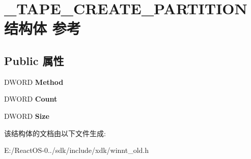 \hypertarget{struct___t_a_p_e___c_r_e_a_t_e___p_a_r_t_i_t_i_o_n}{}\section{\+\_\+\+T\+A\+P\+E\+\_\+\+C\+R\+E\+A\+T\+E\+\_\+\+P\+A\+R\+T\+I\+T\+I\+O\+N结构体 参考}
\label{struct___t_a_p_e___c_r_e_a_t_e___p_a_r_t_i_t_i_o_n}
\subsection*{Public 属性}
\begin{DoxyCompactItemize}
\item 
\mbox{\label{struct___t_a_p_e___c_r_e_a_t_e___p_a_r_t_i_t_i_o_n_a263e15a8475a1097511cfd89737d36f8}} 
D\+W\+O\+RD {\bfseries Method}
\item 
\mbox{\label{struct___t_a_p_e___c_r_e_a_t_e___p_a_r_t_i_t_i_o_n_a4341ab79e76da5fc5f2b8e06b1afebb3}} 
D\+W\+O\+RD {\bfseries Count}
\item 
\mbox{\label{struct___t_a_p_e___c_r_e_a_t_e___p_a_r_t_i_t_i_o_n_a10a33a52ba73a0ca43bb2745a20b5d14}} 
D\+W\+O\+RD {\bfseries Size}
\end{DoxyCompactItemize}


该结构体的文档由以下文件生成\+:\begin{DoxyCompactItemize}
\item 
E\+:/\+React\+O\+S-\/0../sdk/include/xdk/winnt\+\_\+old.\+h\end{DoxyCompactItemize}
